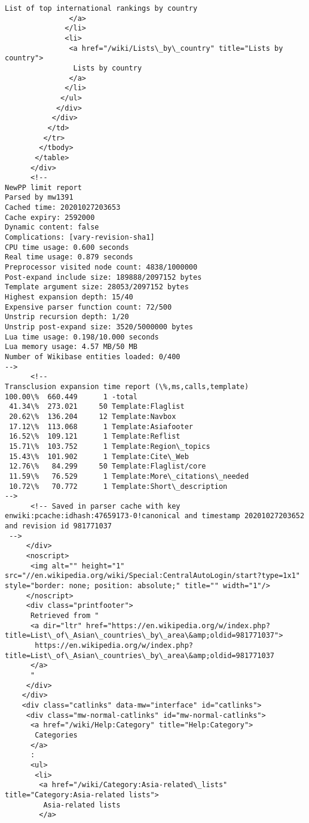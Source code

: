 \documentclass[11pt]{article}
\begin{document}
\begin{Verbatim}[commandchars=\\\{\}]
                List of top international rankings by country
               </a>
              </li>
              <li>
               <a href="/wiki/Lists\_by\_country" title="Lists by country">
                Lists by country
               </a>
              </li>
             </ul>
            </div>
           </div>
          </td>
         </tr>
        </tbody>
       </table>
      </div>
      <!-- 
NewPP limit report
Parsed by mw1391
Cached time: 20201027203653
Cache expiry: 2592000
Dynamic content: false
Complications: [vary‐revision‐sha1]
CPU time usage: 0.600 seconds
Real time usage: 0.879 seconds
Preprocessor visited node count: 4838/1000000
Post‐expand include size: 189888/2097152 bytes
Template argument size: 28053/2097152 bytes
Highest expansion depth: 15/40
Expensive parser function count: 72/500
Unstrip recursion depth: 1/20
Unstrip post‐expand size: 3520/5000000 bytes
Lua time usage: 0.198/10.000 seconds
Lua memory usage: 4.57 MB/50 MB
Number of Wikibase entities loaded: 0/400
-->
      <!--
Transclusion expansion time report (\%,ms,calls,template)
100.00\%  660.449      1 -total
 41.34\%  273.021     50 Template:Flaglist
 20.62\%  136.204     12 Template:Navbox
 17.12\%  113.068      1 Template:Asiafooter
 16.52\%  109.121      1 Template:Reflist
 15.71\%  103.752      1 Template:Region\_topics
 15.43\%  101.902      1 Template:Cite\_Web
 12.76\%   84.299     50 Template:Flaglist/core
 11.59\%   76.529      1 Template:More\_citations\_needed
 10.72\%   70.772      1 Template:Short\_description
-->
      <!-- Saved in parser cache with key enwiki:pcache:idhash:47659173-0!canonical and timestamp 20201027203652 and revision id 981771037
 -->
     </div>
     <noscript>
      <img alt="" height="1" src="//en.wikipedia.org/wiki/Special:CentralAutoLogin/start?type=1x1" style="border: none; position: absolute;" title="" width="1"/>
     </noscript>
     <div class="printfooter">
      Retrieved from "
      <a dir="ltr" href="https://en.wikipedia.org/w/index.php?title=List\_of\_Asian\_countries\_by\_area\&amp;oldid=981771037">
       https://en.wikipedia.org/w/index.php?title=List\_of\_Asian\_countries\_by\_area\&amp;oldid=981771037
      </a>
      "
     </div>
    </div>
    <div class="catlinks" data-mw="interface" id="catlinks">
     <div class="mw-normal-catlinks" id="mw-normal-catlinks">
      <a href="/wiki/Help:Category" title="Help:Category">
       Categories
      </a>
      :
      <ul>
       <li>
        <a href="/wiki/Category:Asia-related\_lists" title="Category:Asia-related lists">
         Asia-related lists
        </a>

\end{Verbatim}
\end{document}

